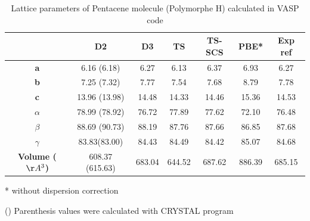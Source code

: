  		
 	
 	\begin{table}[htb]
 		\caption{Lattice parameters of Pentacene molecule (Polymorphe H) calculated in VASP code} \label{table-penta}
 		\begin{center}
 			\begin{threeparttable}
 			\begin{tabular}{c c c c c c c}
 				\toprule
 				& \textbf{D2} & \textbf{D3} & \textbf{TS} & \textbf{TS-SCS} & \textbf{PBE*} & \textbf{Exp} ref\cite{mattheus2001polymorphism} \\
 				\midrule
 				\textbf{a} &6.16 (6.18) & 6.27 & 6.13 & 6.37 & 6.93 & 6.27\\
 				\textbf{b}& 7.25 (7.32) & 7.77 & 7.54 & 7.68 & 8.79 & 7.78 \\
 				\textbf{c}& 13.96 (13.98) & 14.48 & 14.33 & 14.46 & 15.36 & 14.53 \\
 				\textbf{$\alpha$} & 78.99 (78.92) & 76.72 & 77.89 & 77.62 & 72.10 &76.48\\
 				\textbf{$\beta$} & 88.69 (90.73) & 88.19 & 87.76 & 87.66 & 86.85 & 87.68\\
 				\textbf{$\gamma$} & 83.83(83.00) & 84.43 & 84.49 & 84.42 & 85.07 & 84.68\\
 				\textbf{Volume ($\AA^{3}$)} & 608.37 (615.63) & 683.04 & 644.52 & 687.62  & 886.39 & 685.15\\
 				\bottomrule
 			\end{tabular}
 			
 			\begin{tablenotes}
 				\item[*] without dispersion correction
 				\item[()] Parenthesis values were calculated with CRYSTAL program
 			\end{tablenotes}
 		\end{threeparttable}
 		\end{center}
 	\end{table}
 	
